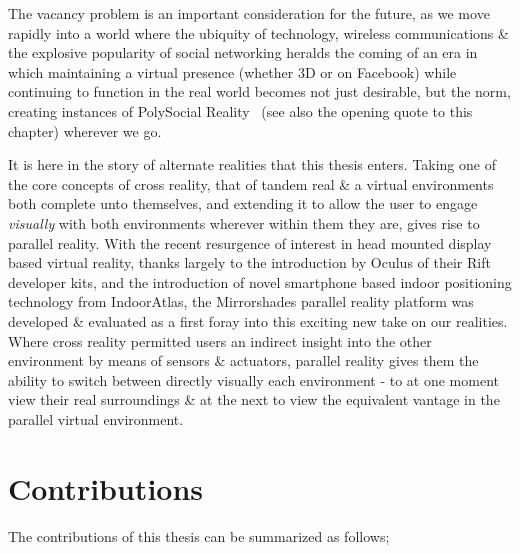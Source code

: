 The vacancy problem is an important consideration for the future, as we move rapidly into a world where the ubiquity of technology, wireless communications \& the explosive popularity of social networking heralds the coming of an era in which maintaining a virtual presence (whether 3D or on Facebook) while continuing to function in the real world becomes not just desirable, but the norm, creating instances of PolySocial Reality~\cite{Applin2012} (see also the opening quote to this chapter) wherever we go.

It is here in the story of alternate realities that this thesis enters. Taking one of the core concepts of cross reality, that of tandem real \& a virtual environments both complete unto themselves, and extending it to allow the user to engage \textit{visually} with both environments wherever within them they are, gives rise to parallel reality. With the recent resurgence of interest in head mounted display based virtual reality, thanks largely to the introduction by Oculus of their Rift developer kits, and the introduction of novel smartphone based indoor positioning technology from IndoorAtlas, the Mirrorshades parallel reality platform was developed \& evaluated as a first foray into this exciting new take on our realities. Where cross reality permitted users an indirect insight into the other environment by means of sensors \& actuators, parallel reality gives them the ability to switch between directly visually each environment - to at one moment view their real surroundings \& at the next to view the equivalent vantage in the parallel virtual environment.


\section{Contributions}
\label{intro-contributions}
The contributions of this thesis can be summarized as follows;

